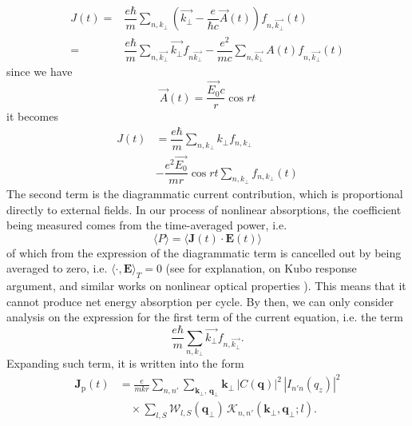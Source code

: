 \documentclass[%
 reprint,
 amsmath,amssymb,
 aps,
]{revtex4-2}
\begin{document}
\begin{align*} 
    J(t) = & \dfrac{e\hbar}{m} \sum_{n,k_\bot}\left(\vec{k_\bot}-\dfrac{e}{\hbar c} \vec{A}(t)\right) f_{n,\vec{k_\bot}}(t) \\ = & \dfrac{e\hbar}{m}\sum_{n,\vec{k_\bot}}\vec{k_\bot}f_{n\vec{k_\bot}}-\dfrac{e^2}{mc}\sum_{n,\vec{k_\bot}}A(t)f_{n,\vec{k_\bot}}(t) 
\end{align*}
since we have
\begin{equation}
    \vec{A}(t) = \dfrac{\vec{E_0}c}{r}\cos{rt}
\end{equation}
it becomes
\begin{equation}
    \begin{split}
        J(t) &= \dfrac{e\hbar}{m}\sum_{n,k_\bot}k_\bot f_{n,k_\bot}\\
        &-\dfrac{e^2\vec{E_0}}{mr} \cos{rt} \sum_{n,k_\bot}f_{n,k_\bot}(t)
    \end{split}
\end{equation}
The second term is the diagrammatic current contribution, which is proportional directly to external fields. In our process of nonlinear absorptions, the coefficient being measured comes from the time-averaged power, i.e. 
\begin{equation}
    \langle P \rangle = \langle \mathbf{J}(t) \cdot \mathbf{E}(t)\rangle 
\end{equation}
of which from the expression of the diagrammatic term is cancelled out by being averaged to zero, i.e. $\langle\cdot, \mathbf{E}\rangle_{T}=0$ (see \cite{bruus_flensberg_2004,mahan_2000} for explanation, \cite{kubo_1957,murthy_2014_kubo} on Kubo response argument, and similar works on nonlinear optical properties \cite{aversa_sipe_1995,watanabe_etal_2020}). This means that it cannot produce net energy absorption per cycle. By then, we can only consider analysis on the expression for the first term of the current equation, i.e. the term
\begin{equation}
    \dfrac{e\hbar}{m}\sum_{n,k_\bot}\vec{k_\bot}f_{n,\vec{k_\bot}}.
\end{equation}
Expanding such term, it is written into the form
\begin{equation}
\begin{split}
\mathbf J_{\mathrm p}(t)
&=
\frac{e}{m k r}
\sum_{n,n'}
\sum_{\mathbf k_{\perp},\,\mathbf q_{\perp}}
\mathbf k_{\perp}
\, |C(\mathbf q)|^2
\, |I_{n'n}(q_z)|^2
\\
&\quad \times
\sum_{l,S}
\mathcal W_{l,S}(\mathbf q_{\perp})
\,
\mathcal K_{n,n'}(\mathbf k_{\perp},\mathbf q_{\perp};l).
\end{split}
\end{equation}
\end{document}
